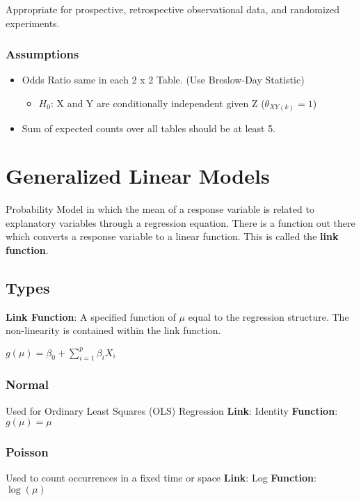 \documentclass[11pt]{article}
\begin{document}
Appropriate for prospective, retrospective observational data, and
randomized experiments.

\subsubsection{Assumptions}
\label{sec:org7d3686f}
\begin{itemize}
\item Odds Ratio same in each 2 x 2 Table. (Use Breslow-Day Statistic)

\begin{itemize}
\item \(H_0\): X and Y are conditionally independent given Z
(\(\theta_{XY(k)} = 1\))
\end{itemize}

\item Sum of expected counts over all tables should be at least 5.
\end{itemize}

\section{Generalized Linear Models}
\label{sec:org87583e4}
Probability Model in which the mean of a response variable is related to
explanatory variables through a regression equation. There is a function
out there which converts a response variable to a linear function. This
is called the \textbf{link function}.

\subsection{Types}
\label{sec:orgd45eb9c}
\textbf{Link Function}: A specified function of \(\mu\) equal to the regression
structure. The non-linearity is contained within the link function.

\(g(\mu) = \beta_0 + \sum_{i = 1}^p \beta_i X_i\)

\subsubsection{Normal}
\label{sec:orge94e9b6}
Used for Ordinary Least Squares (OLS) Regression \textbf{Link}: Identity
\textbf{Function}: \(g(\mu) = \mu\)

\subsubsection{Poisson}
\label{sec:org19e95b7}
Used to count occurrences in a fixed time or space \textbf{Link}: Log
\textbf{Function}: \(\log(\mu)\)
\end{document}
